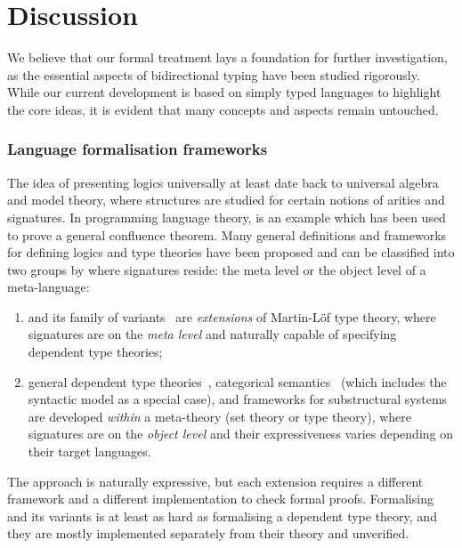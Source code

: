 
\section{Discussion} \label{sec:future}
We believe that our formal treatment lays a foundation for further investigation, as the essential aspects of bidirectional typing have been studied rigorously. 
While our current development is based on simply typed languages to highlight the core ideas, it is evident that many concepts and aspects remain untouched.
\subsubsection{Language formalisation frameworks}

The idea of presenting logics universally at least date back to universal algebra and model theory, where structures are studied for certain notions of arities and signatures.
In programming language theory,  is an example which has been used to prove a general confluence theorem.
Many general definitions and frameworks for defining logics and type theories have been proposed and can be classified into two groups by where signatures reside: the meta level or the object level of a meta-language:
\begin{enumerate}
  \item {} and its family of variants~\cite{Harper2007,Assaf2016,Felicissimo2023} are \emph{extensions} of Martin-L\"of type theory, where signatures are on the \emph{meta level} and naturally capable of specifying dependent type theories;
\item general dependent type theories~\cite{Bauer2020,Haselwarter2021,Bauer2022a,Uemura2021}, categorical semantics~\cite{Fiore1999,Tanaka2006,Tanaka2006a,Fiore2010,Hamana2011,Fiore2013,Arkor2020,Fiore2022} (which includes the syntactic model as a special case), and frameworks for substructural systems~\cite{Tanaka2006,Tanaka2006a,Wood2022} are developed \emph{within} a meta-theory (set theory or type theory), where signatures are on the \emph{object level} and their expressiveness varies depending on their target languages.
\end{enumerate}

The \LF approach is naturally expressive, but each extension requires a different framework and a different implementation to check formal \LF proofs.
Formalising \LF and its variants is at least as hard as formalising a dependent type theory, and they are mostly implemented separately from their theory and unverified.

